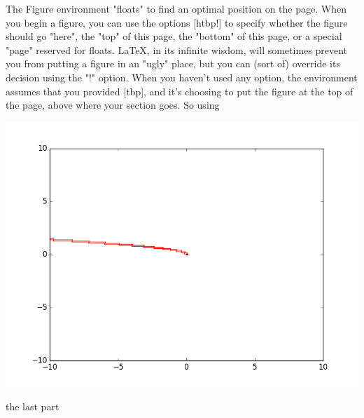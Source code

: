 The Figure environment "floats" to find an optimal position on the page. When you begin a figure, you can use the options [htbp!] to specify whether the figure should go "here", the "top" of this page, the "bottom" of this page, or a special "page" reserved for floats. LaTeX, in its infinite wisdom, will sometimes prevent you from putting a figure in an "ugly" place, but you can (sort of) override its decision using the "!" option. When you haven't used any option, the environment assumes that you provided [tbp], and it's choosing to put the figure at the top of the page, above where your section goes. So using

\begin{minipage}{\linewidth}
    \begin{center}
        \includegraphics[width=1.0\linewidth]{content/sources/2}
    \end{center}
\end{minipage}

the last part 
